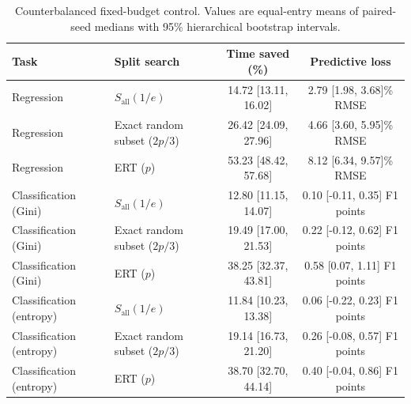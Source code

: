 \begin{table}[t]
\centering
\small
\caption{Counterbalanced fixed-budget control. Values are equal-entry means of paired-seed medians with 95\% hierarchical bootstrap intervals.}
\label{tab:supp_direct_control}
\begin{tabular}{llcc}
\toprule
Task & Split search & Time saved (\%) & Predictive loss \\
\midrule
Regression & $S_{\mathrm{all}}(1/e)$ & 14.72 [13.11, 16.02] & 2.79 [1.98, 3.68]\% RMSE \\
Regression & Exact random subset ($2p/3$) & 26.42 [24.09, 27.96] & 4.66 [3.60, 5.95]\% RMSE \\
Regression & ERT ($p$) & 53.23 [48.42, 57.68] & 8.12 [6.34, 9.57]\% RMSE \\
Classification (Gini) & $S_{\mathrm{all}}(1/e)$ & 12.80 [11.15, 14.07] & 0.10 [-0.11, 0.35] F1 points \\
Classification (Gini) & Exact random subset ($2p/3$) & 19.49 [17.00, 21.53] & 0.22 [-0.12, 0.62] F1 points \\
Classification (Gini) & ERT ($p$) & 38.25 [32.37, 43.81] & 0.58 [0.07, 1.11] F1 points \\
Classification (entropy) & $S_{\mathrm{all}}(1/e)$ & 11.84 [10.23, 13.38] & 0.06 [-0.22, 0.23] F1 points \\
Classification (entropy) & Exact random subset ($2p/3$) & 19.14 [16.73, 21.20] & 0.26 [-0.08, 0.57] F1 points \\
Classification (entropy) & ERT ($p$) & 38.70 [32.70, 44.14] & 0.40 [-0.04, 0.86] F1 points \\
\bottomrule
\end{tabular}
\end{table}
